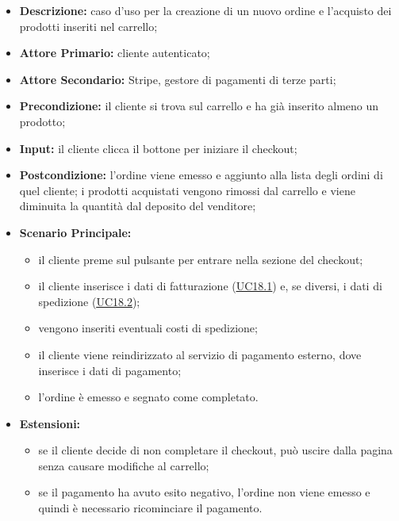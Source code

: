                 \begin{itemize}
                \item \textbf{Descrizione:} caso d'uso per la creazione di un nuovo ordine e l'acquisto dei prodotti inseriti nel carrello;
                \item \textbf{Attore Primario:} cliente autenticato;
                \item \textbf{Attore Secondario:} Stripe, gestore di pagamenti di terze parti;
                \item \textbf{Precondizione:} il cliente si trova sul carrello e ha già inserito almeno un prodotto;
                \item \textbf{Input:} il cliente clicca il bottone per iniziare il checkout;
                \item \textbf{Postcondizione:} l'ordine viene emesso e aggiunto alla lista degli ordini di quel cliente; i prodotti acquistati vengono rimossi dal carrello e viene diminuita la quantità dal deposito del venditore;
                \item \textbf{Scenario Principale:} 
                    \begin{itemize}
                        \item il cliente preme sul pulsante per entrare nella sezione del checkout;
                        \item il cliente inserisce i dati di fatturazione (\hyperref[sec:UC18.1]{\underline{UC18.1}}) e, se diversi, i dati di spedizione (\hyperref[sec:UC18.2]{\underline{UC18.2}});
                        \item vengono inseriti eventuali costi di spedizione;
                        \item il cliente viene reindirizzato al servizio di pagamento esterno, dove inserisce i dati di pagamento;
                        \item l'ordine è emesso e segnato come completato.
                    \end{itemize}
                \item \textbf{Estensioni:}
                    \begin{itemize}
                        \item se il cliente decide di non completare il checkout, può uscire dalla pagina senza causare modifiche al carrello;
                        \item se il pagamento ha avuto esito negativo, l'ordine non viene emesso e quindi è necessario ricominciare il pagamento.
                    \end{itemize}
            \end{itemize}
